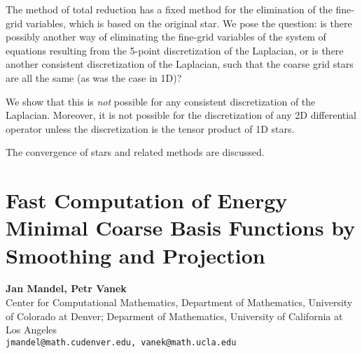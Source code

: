 \documentclass[11pt]{article}
\newcommand{\nextab}[4]{
	\section{#2}
	{\bf #1} \\ \nopagebreak
	{#3} \\ \nopagebreak
	{\tt #4} \nopagebreak
	}
\begin{document}
The method of total reduction has a fixed method for the elimination
of the fine-grid variables, which is based on the original star. We
pose the question: is there possibly another way of eliminating the
fine-grid variables of the system of equations resulting from the 5-point
discretization of the Laplacian, or is there another consistent
discretization of the Laplacian, such that the coarse grid stars are
all the same (as was the case in 1D)?

We show that this is {\em not} possible for any consistent discretization
of the Laplacian. Moreover, it is not possible for the discretization of
any 2D differential operator unless the discretization is the tensor
product of 1D stars.

The convergence of stars and related methods are discussed.



\nextab{Jan Mandel, Petr Vanek}
	{Fast Computation of Energy Minimal Coarse Basis Functions
		by Smoothing and Projection}
	{Center for Computational Mathematics,
		Department of Mathematics,
		University of Colorado at Denver;
		Deparment of Mathematics,
		University of California at Los Angeles}
	{jmandel@math.cudenver.edu, vanek@math.ucla.edu}
\end{document}
